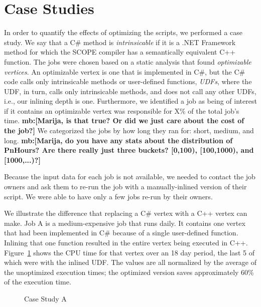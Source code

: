 \section{Case Studies}
In order to quantify the effects of optimizing the scripts, we performed a case study.
We say that a C\# method is {\em intrinsicable} if it is a .NET Framework method for which the SCOPE compiler has a semantically equivalent C++ function.
The jobs were chosen based on a static analysis that found {\em optimizable vertices}.
An optimizable vertex is one that is implemented in C\#, but the C\# code calls only intrinsicable methods or user-defined functions, {\em UDFs}, where the UDF, in turn, calls only intrinsicable methods, and does not call any other UDFs, i.e., our inlining depth is one.
Furthermore, we identified a job as being of interest if it contains an optimizable vertex was responsible for X\% of the total job's time.
{\bf mb:[Marija, is that true? Or did we just care about the cost of the job?]}
We categorized the jobs by how long they ran for: short, medium, and long.
{\bf mb:[Marija, do you have any stats about the distribution of PnHours? Are there really just three buckets? [0,100), [100,1000), and [1000,...)?]}

Because the input data for each job is not available, we needed to contact the job owners and ask them to re-run the job with a manually-inlined version of their script.
We were able to have only a few jobs re-run by their owners.

We illustrate the difference that replacing a C\# vertex with a C++ vertex can make.
Job A is a medium-expensive job that runs daily.
It contains one vertex that had been implemented in  C\# because of a single user-defined function.
Inlining that one function resulted in the entire vertex being executed in C++.
Figure~\ref{fig:CaseStudyA} shows the CPU time for that vertex over an 18 day period, the last 5 of which were with the inlined UDF.
The values are all normalized by the average of the unoptimized execution times; the optimized version saves approximately 60\% of the execution time.

\begin{figure}[ht]
\caption{Case Study A \label{fig:CaseStudyA}}
\end{figure}

